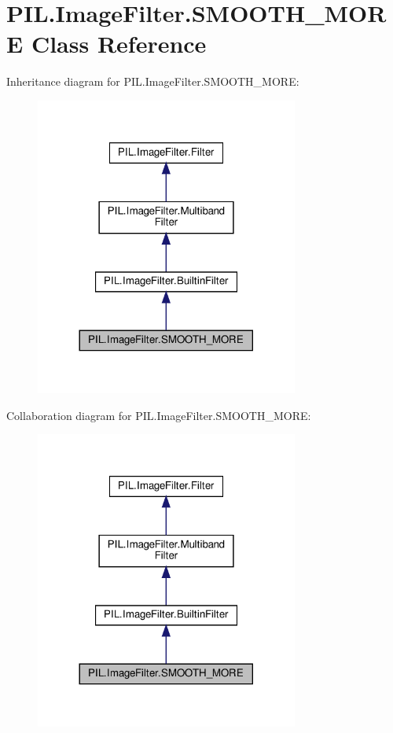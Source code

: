 \hypertarget{classPIL_1_1ImageFilter_1_1SMOOTH__MORE}{}\section{P\+I\+L.\+Image\+Filter.\+S\+M\+O\+O\+T\+H\+\_\+\+M\+O\+RE Class Reference}
\label{classPIL_1_1ImageFilter_1_1SMOOTH__MORE}


Inheritance diagram for P\+I\+L.\+Image\+Filter.\+S\+M\+O\+O\+T\+H\+\_\+\+M\+O\+RE\+:
\nopagebreak
\begin{figure}[H]
\begin{center}
\leavevmode
\includegraphics[width=245pt]{classPIL_1_1ImageFilter_1_1SMOOTH__MORE__inherit__graph}
\end{center}
\end{figure}


Collaboration diagram for P\+I\+L.\+Image\+Filter.\+S\+M\+O\+O\+T\+H\+\_\+\+M\+O\+RE\+:
\nopagebreak
\begin{figure}[H]
\begin{center}
\leavevmode
\includegraphics[width=245pt]{classPIL_1_1ImageFilter_1_1SMOOTH__MORE__coll__graph}
\end{center}
\end{figure}
